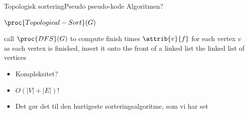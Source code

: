 \documentclass[aspectratio=1610]{beamer}
\begin{document}
\begin{frame}{Topologisk sortering}{Pseudo pseudo-kode}
    Algoritmen?

    \begin{block}{$\proc{Topological-Sort}(G)$}
        \footnotesize
    
        \vspace{-\abovedisplayskip}
        \begin{codebox}
            \li call $\proc{DFS}(G)$ to compute finish times $\attrib{v}{f}$ for
            each vertex $v$
            \li as each vertex is finished, insert it onto the front of a linked
            list
            \li \Return the linked list of vertices
        \end{codebox}
    \end{block}

    \begin{itemize}[<+(1)->]
        \item Kompleksitet?
        \item $O(|V| + |E|)$! 
        \item Det gør det til den hurtigeste sorteringsalgoritme, som vi har set
    \end{itemize}

\end{frame}
\end{document}
